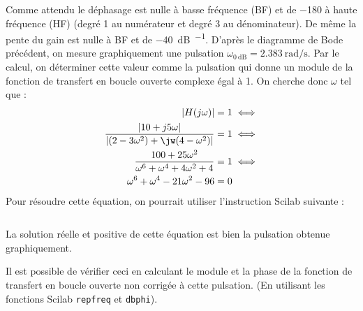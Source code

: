 Comme attendu le déphasage est nulle à basse fréquence (BF) et de 
\SI{-180}{\degreeSI} à haute fréquence (HF) (degré 1 au numérateur et 
degré 3 au dénominateur). De même la pente du gain est nulle à BF et 
de \SI{-40}{\dB\per\dec}.
D'après le diagramme de Bode précédent, on mesure graphiquement une pulsation
$\omega_{\SI{0}{\dB}}=\SI{2.383}{\radian\per\second}$.
Par le calcul, on déterminer cette valeur comme la pulsation qui donne un 
module de la fonction de transfert en boucle ouverte complexe égal à 1.
On cherche donc $\omega$ tel que :
\begin{align*}
    |H(j\omega)|=1 &\iff \\
    \dfrac{|10+j5\omega|}{|(2-3\omega^2)+\jw(4-\omega^2)|}=1 &\iff \\
    \dfrac{100+25\omega^2}{\omega^6+\omega^4+4\omega^2+4}=1 &\iff \\
    \omega^6+\omega^4-21\omega^2-96=0
\end{align*}
Pour résoudre cette équation, on pourrait utiliser l'instruction Scilab 
suivante :
\inputminted{scilab}{scilab/code_q2_1_chap_correction.sce}
La solution réelle et positive de cette équation est bien la pulsation obtenue
graphiquement.

Il est possible de vérifier ceci en calculant le module et la phase de la 
fonction de transfert en boucle ouverte non corrigée à cette pulsation. 
(En utilisant les fonctions Scilab \texttt{repfreq} et \texttt{dbphi}). 
\inputminted{scilab}{scilab/code_q2_2_chap_correction.sce}

